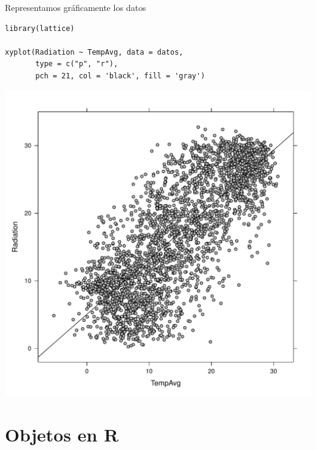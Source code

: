 \documentclass[aspectratio=169, usenames,svgnames,dvipsnames]{beamer}
\begin{document}
\begin{frame}[label={sec:org78ff6ea},fragile]{Representamos gráficamente los datos}
 \lstset{language=r,label= ,caption= ,captionpos=b,numbers=none}
\begin{lstlisting}
library(lattice)

xyplot(Radiation ~ TempAvg, data = datos,
       type = c("p", "r"),
       pch = 21, col = 'black', fill = 'gray')
\end{lstlisting}

\begin{center}
\includegraphics[height=0.6\textheight]{figs/intro.pdf}
\end{center}
\end{frame}

\section{Objetos en R}
\label{sec:orge7b988a}
\end{document}
